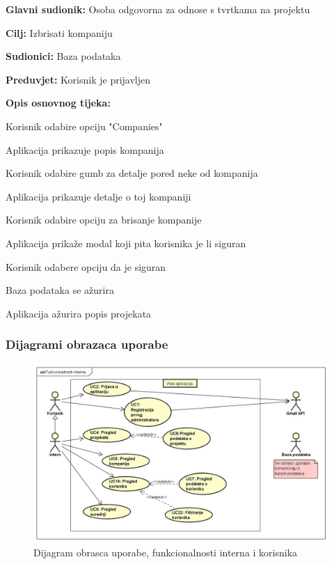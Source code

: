 					\noindent {}
					\begin{packed_item}

						\item \textbf{Glavni sudionik:} Osoba odgovorna za odnose s tvrtkama na projektu
						\item \textbf{Cilj:} Izbrisati kompaniju
						\item \textbf{Sudionici:} Baza podataka
						\item \textbf{Preduvjet:} Korisnik je prijavljen
						\item \textbf{Opis osnovnog tijeka:}

						\item[] \begin{packed_enum}

							\item Korisnik odabire opciju "Companies"
							\item Aplikacija prikazuje popis kompanija
							\item Korisnik odabire gumb za detalje pored neke od kompanija
							\item Aplikacija prikazuje detalje o toj kompaniji
							\item Korisnik odabire opciju za brisanje kompanije
							\item Aplikacija prikaže modal koji pita korisnika je li siguran
							\item Korisnik odabere opciju da je siguran
							\item Baza podataka se ažurira
							\item Aplikacija ažurira popis projekata

						\end{packed_enum}

					\end{packed_item}

				\subsubsection{Dijagrami obrazaca uporabe}

					\begin{figure}[H]
						\includegraphics[scale=0.4]{slike/UC dijagrami/UseCase observer}
						\centering
						\caption{Dijagram obrasca uporabe, funkcionalnosti interna i korisnika}
						\label{fig:observer}
					\end{figure}

